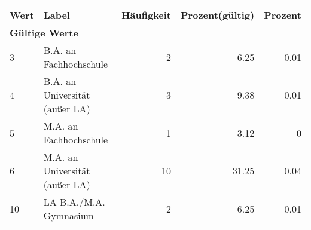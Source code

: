      \begin{longtable}{lXrrr}
     \toprule
     \textbf{Wert} & \textbf{Label} & \textbf{Häufigkeit} & \textbf{Prozent(gültig)} & \textbf{Prozent} \\
     \endhead
     \midrule
     \multicolumn{5}{l}{\textbf{Gültige Werte}}\\

     3 &
     \multicolumn{1}{X}{ B.A. an Fachhochschule   } &


       \num{2} &
       \num[round-mode=places,round-precision=2]{6.25} &
         \num[round-mode=places,round-precision=2]{0.01} \\

     4 &
     \multicolumn{1}{X}{ B.A. an Universität (außer LA)   } &


       \num{3} &
       \num[round-mode=places,round-precision=2]{9.38} &
         \num[round-mode=places,round-precision=2]{0.01} \\

     5 &
     \multicolumn{1}{X}{ M.A. an Fachhochschule   } &


       \num{1} &
       \num[round-mode=places,round-precision=2]{3.12} &
         \num[round-mode=places,round-precision=2]{0} \\

     6 &
     \multicolumn{1}{X}{ M.A. an Universität (außer LA)   } &


       \num{10} &
       \num[round-mode=places,round-precision=2]{31.25} &
         \num[round-mode=places,round-precision=2]{0.04} \\

     10 &
     \multicolumn{1}{X}{ LA B.A./M.A. Gymnasium   } &


       \num{2} &
       \num[round-mode=places,round-precision=2]{6.25} &
         \num[round-mode=places,round-precision=2]{0.01} \\


\end{longtable}
